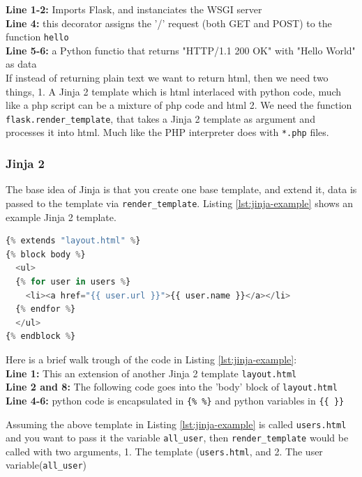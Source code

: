 \documentclass[]{report}   %
\begin{document}
\textbf{Line 1-2:} Imports Flask, and instanciates the WSGI server \\
\textbf{Line 4:} this decorator\cite{py_decorator} assigns the '/' request (both GET and POST) to
the function \texttt{hello} \\
\textbf{Line 5-6:} a Python functio that returns "HTTP/1.1 200 OK" with "Hello
World" as data \\

If instead of returning plain text we want to return html, then we need two
things, 1. A Jinja 2 template which is html interlaced with python code, much
like a php script can be a mixture of php code and html 2. We need the function
\texttt{flask.render\_template}, that takes a Jinja 2 template as argument and
processes it into html. Much like the PHP interpreter does with \texttt{*.php} files.

\subsubsection{Jinja 2}
The base idea of Jinja is that you create one base template, and extend it,
data is passed to the template via \texttt{render\_template}. Listing
\ref{lst:jinja-example} shows an example Jinja 2 template.

\begin{minipage}{\linewidth}
\begin{lstlisting}[language=python, label={lst:jinja-example},
                   caption={Jinja 2 example}]
{% extends "layout.html" %}
{% block body %}
  <ul>
  {% for user in users %}
    <li><a href="{{ user.url }}">{{ user.name }}</a></li>
  {% endfor %}
  </ul>
{% endblock %}
\end{lstlisting}
\end{minipage}

Here is a brief walk trough of the code in Listing \ref{lst:jinja-example}: \\
\textbf{Line 1:} This an extension of another Jinja 2 template \texttt{layout.html} \\
\textbf{Line 2 and 8:} The following code goes into the 'body' block of
\texttt{layout.html} \\
\textbf{Line 4-6:} python code is encapsulated in \texttt{\{\% \%\}} and python
variables in \texttt{\{\{ \}\}}

Assuming the above template in Listing \ref{lst:jinja-example} is called
\texttt{users.html} and you want to pass it the variable \texttt{all\_user},
then \texttt{render\_template} would be called with two arguments, 1. The
template (\texttt{users.html}, and 2. The user variable(\texttt{all\_user})
\end{document}
